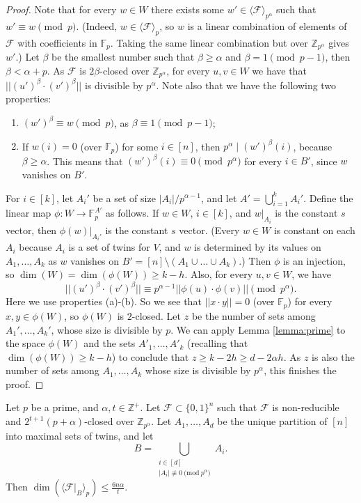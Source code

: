 \begin{proof}
		Note that for every $w\in W$ there exists some $w'\in \langle\mathcal{F}\rangle_{p^{\alpha}}$ such that $w'\equiv w \pmod p$. (Indeed, $w \in \langle\mathcal{F}\rangle_{p}$, so $w$ is a linear combination of elements of $\mathcal{F}$ with coefficients in $\mathbb{F}_p$. Taking the same linear combination but over $\mathbb{Z}_{p^{\alpha}}$ gives $w'$.) Let $\beta$ be the smallest number such that $\beta \geq \alpha$ and $\beta=1 \pmod{p-1}$, then $\beta<\alpha+p$. As $\mathcal{F}$ is $2\beta$-closed over $\mathbb{Z}_{p^{\alpha}}$, for every $u,v\in W$ we have that $||(u')^{\beta}\cdot (v')^{\beta}||$ is divisible by $p^{\alpha}$. Note also that we have the following two properties:
		\begin{enumerate}
		    \item[(a)]$(w')^{\beta}\equiv w \pmod p$, as $\beta \equiv 1 \pmod{p-1}$;
		    \item[(b)]If $w(i)=0$ (over $\mathbb{F}_p$) for some $i\in [n]$, then $p^{\alpha}\mid (w')^{\beta}(i)$, because $\beta \geq \alpha$. This means that $(w')^{\beta}(i) \equiv 0 \pmod{p^{\alpha}}$ for every $i \in B'$, since $w$ vanishes on $B'$.
		\end{enumerate}
		For $i\in [k]$, let $A_{i}'$ be a set of size $|A_{i}|/p^{\alpha-1}$, and let $A'=\bigcup_{i=1}^{k}A_{i}'$. Define the linear map $\phi:W\rightarrow\mathbb{F}_p^{A'}$ as follows. If $w\in W$, $i\in [k]$, and $w|_{A_i}$ is the constant $s$ vector, then $\phi(w)|_{A_i'}$ is the constant $s$ vector. 
		(Every $w \in W$ is constant on each $A_i$ because $A_i$ is a set of twins for $V$, and $w$ is determined by its values on $A_1,\dots,A_k$ as $w$ vanishes on $B' = [n] \setminus (A_1 \cup \dots \cup A_k)$.)
		Then $\phi$ is an injection, so $\dim(W)=\dim(\phi(W)) \geq k - h$. Also, for every $u,v\in W$, we have 
		$$||(u')^{\beta}\cdot (v')^{\beta}||\equiv p^{\alpha-1}||\phi(u)\cdot \phi(v)|| \pmod {p^{\alpha}}.$$
		Here we use properties (a)-(b).
		So we see that $||x\cdot y||=0$ (over $\mathbb{F}_p$) for every $x,y\in\phi(W)$, so $\phi(W)$ is $2$-closed. Let $z$ be the number of sets among $A_1',\dots,A_k'$, whose size is divisible by $p$. We can apply Lemma \ref{lemma:prime} to the space $\phi(W)$ and the sets $A'_1,\dots,A'_k$ (recalling that $\dim(\phi(W)) \geq k - h$) to conclude that 
		$z\geq k-2h\geq d-2\alpha h.$
		As $z$ is also the number of sets among $A_1,\dots,A_k$ whose size is divisible by $p^{\alpha}$, this finishes the proof.
	\end{proof}
	
	\begin{lemma}\label{lemma:smalldim}
		Let $p$ be a prime, and $\alpha,t\in\mathbb{Z}^{+}$. Let $\mathcal{F}\subset \{0,1\}^{n}$ such that $\mathcal{F}$ is non-reducible and ${2^{t+1}(p+\alpha)}$-closed over $\mathbb{Z}_{p^{\alpha}}$. Let $A_1,\dots,A_d$ be the unique partition of $[n]$ into maximal sets of twins, and \nolinebreak let $$B=\bigcup_{\substack{i\in [d]\\|A_i|\not\equiv 0\ \mathrm{(mod }\ p^{\alpha})}}A_{i}.$$ Then $\dim(\langle \mathcal{F}|_{B}\rangle_{p})\leq \frac{6n\alpha}{t}$.
	\end{lemma}
	
